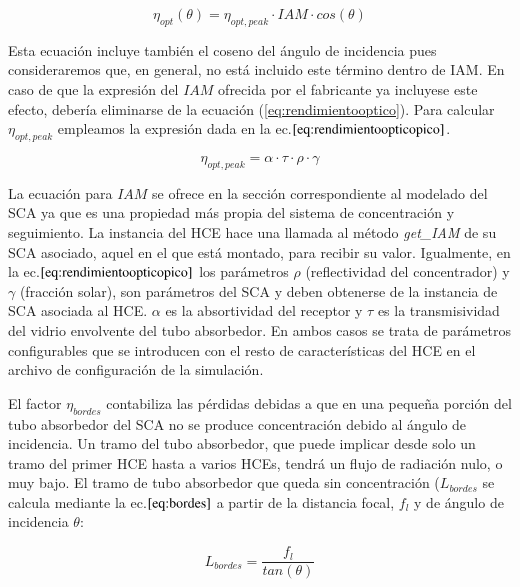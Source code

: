 \begin{equation}
   \eta_{opt}(\theta) = \eta_{opt,peak} \cdot IAM \cdot cos(\theta)
    \label{eq:rendimientooptico}
\end{equation}

Esta ecuación incluye también el coseno del ángulo de incidencia pues consideraremos que, en general, no está incluido este término dentro de IAM. En caso de que la expresión del $IAM$ ofrecida por el fabricante ya incluyese este efecto, debería eliminarse de la ecuación (\ref{eq:rendimientooptico}). 
Para calcular \(\eta_{opt,peak}\) empleamos la expresión dada en la ec.\(\eqref{eq:rendimientoopticopico}\). 

\begin{equation}
   \eta_{opt,peak} = \alpha \cdot \tau \cdot \rho \cdot \gamma
    \label{eq:rendimientoopticopico}
\end{equation}

La ecuación para \(IAM\) se ofrece en la sección correspondiente al modelado del SCA ya que es una propiedad más propia del sistema de concentración y seguimiento. La instancia del HCE hace una llamada al método \emph{get\_IAM} de su SCA asociado, aquel en el que está montado, para recibir su valor. Igualmente, en la ec.\(\eqref{eq:rendimientoopticopico}\) los parámetros \(\rho\) (reflectividad del concentrador) y \(\gamma\) (fracción solar), son parámetros del SCA y deben obtenerse de la instancia de SCA asociada al HCE. \(\alpha\) es la absortividad del receptor y \(\tau\) es la transmisividad del vidrio envolvente del tubo absorbedor. En ambos casos se trata de parámetros configurables que se introducen con el resto de características del HCE en el archivo de configuración de la simulación.

El factor \(\eta_{bordes}\) contabiliza las pérdidas debidas a que en una   pequeña porción del tubo absorbedor del SCA no se produce   concentración debido al ángulo de incidencia. Un tramo del tubo   absorbedor, que puede implicar desde solo un tramo del primer HCE  hasta a varios HCEs, tendrá un flujo de radiación nulo, o muy bajo. El   tramo de tubo absorbedor que queda sin concentración (\(L_{bordes}\)   se calcula mediante la ec.\(\eqref{eq:bordes}\) a partir de la   distancia focal, \(f_l\) y de ángulo de incidencia \(\theta\):

\begin{equation}
   L_{bordes} = \frac {f_l}{tan(\theta)}
    \label{eq:bordes}
\end{equation}

